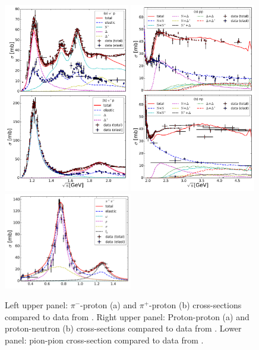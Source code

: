 \begin{figure}
  \centering
  \includegraphics[width=0.49\textwidth]{plots/smash/piN.pdf}
  \includegraphics[width=0.49\textwidth]{plots/smash/NN.pdf}\\
  \includegraphics[width=0.5\textwidth]{plots/smash/pipi.pdf}

  \caption{Left upper panel: $\pi^-$-proton (a) and $\pi^+$-proton (b) cross-sections
                             compared to data from \cite{Agashe:2014kda}.
           Right upper panel: Proton-proton (a) and proton-neutron (b) cross-sections
                              compared to data from \cite{Agashe:2014kda}.
           Lower panel: pion-pion cross-section compared to data
                        from \cite{Protopopescu:1973sh,Alekseeva:1982uy}.}
  \label{fig:xs}
\end{figure}


